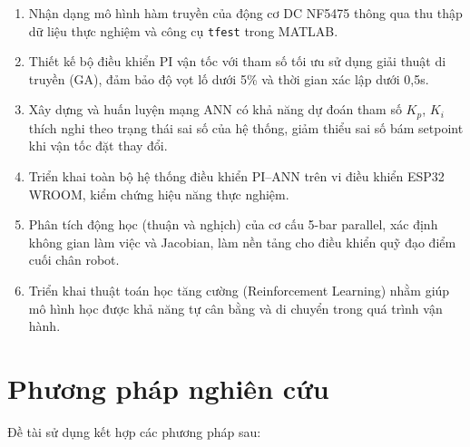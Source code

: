 \begin{enumerate}[leftmargin=1.5cm, label=\arabic*.]
    \item Nhận dạng mô hình hàm truyền của động cơ DC NF5475 thông qua thu thập
    dữ liệu thực nghiệm và công cụ \texttt{tfest} trong MATLAB.

    \item Thiết kế bộ điều khiển PI vận tốc với tham số tối ưu sử dụng giải thuật di
    truyền (GA), đảm bảo độ vọt lố dưới 5\% và thời gian xác lập dưới 0{,}5s.

    \item Xây dựng và huấn luyện mạng ANN có khả năng dự đoán tham số $K_p$, $K_i$
    thích nghi theo trạng thái sai số của hệ thống, giảm thiểu sai số bám setpoint khi
    vận tốc đặt thay đổi.

    \item Triển khai toàn bộ hệ thống điều khiển PI--ANN trên vi điều khiển ESP32
    WROOM, kiểm chứng hiệu năng thực nghiệm.

    \item Phân tích động học (thuận và nghịch) của cơ cấu 5-bar parallel, xác định
    không gian làm việc và Jacobian, làm nền tảng cho điều khiển quỹ đạo điểm cuối
    chân robot.
    
    \item Triển khai thuật toán học tăng cường (Reinforcement Learning) nhằm giúp mô hình học được khả năng tự cân bằng và di chuyển trong quá trình vận hành.
\end{enumerate}


\section{Phương pháp nghiên cứu}

Đề tài sử dụng kết hợp các phương pháp sau:

